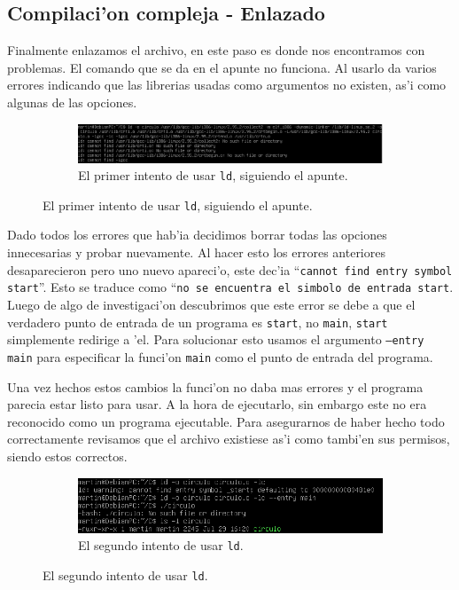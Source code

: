 \documentclass[11pt]{article}
\begin{document}
	\subsection{Compilaci'on compleja - Enlazado}
		Finalmente enlazamos el archivo, en este paso es donde nos encontramos con problemas. El comando que se da en el apunte no funciona. Al usarlo da varios errores indicando que las librerias usadas como argumentos no existen, as'i como algunas de las opciones.
	
		\begin{figure}[H]
			\centering
			\begin{subfigure}[b!]{0.7\linewidth}
				\includegraphics[width=\linewidth]{Images/Seccion 1/S1 parte cinco.PNG}
				\caption*{El primer intento de usar \texttt{ld}, siguiendo el apunte.}
			\end{subfigure}
		\end{figure}
		
		Dado todos los errores que hab'ia decidimos borrar todas las opciones innecesarias y probar nuevamente. Al hacer esto los errores anteriores desaparecieron pero uno nuevo apareci'o, este dec'ia ``\texttt{cannot find entry symbol \textunderscore\/start}''. Esto se traduce como ``\texttt{no se encuentra el simbolo de entrada \textunderscore\/start}. Luego de algo de investigaci'on descubrimos que este error se debe a que el verdadero punto de entrada\footnotemark\/ de un programa es \texttt{\textunderscore\/start}, no \texttt{main}, \texttt{\textunderscore\/start} simplemente redirige a 'el. Para solucionar esto usamos el argumento \texttt{--entry main} para especificar la funci'on \texttt{main} como el punto de entrada del programa.
		
		Una vez hechos estos cambios la funci'on no daba mas errores y el programa parecia estar listo para usar. A la hora de ejecutarlo, sin embargo este no era reconocido como un programa ejecutable. Para asegurarnos de haber hecho todo correctamente revisamos que el archivo existiese as'i como tambi'en sus permisos, siendo estos correctos.
		
		
		\begin{figure}[H]
			\centering
			\begin{subfigure}[b!]{0.7\linewidth}
				\includegraphics[width=\linewidth]{Images/Seccion 1/S1 parte seis.PNG}
				\caption*{El segundo intento de usar \texttt{ld}.}
			\end{subfigure}
		\end{figure}
		
\end{document}
